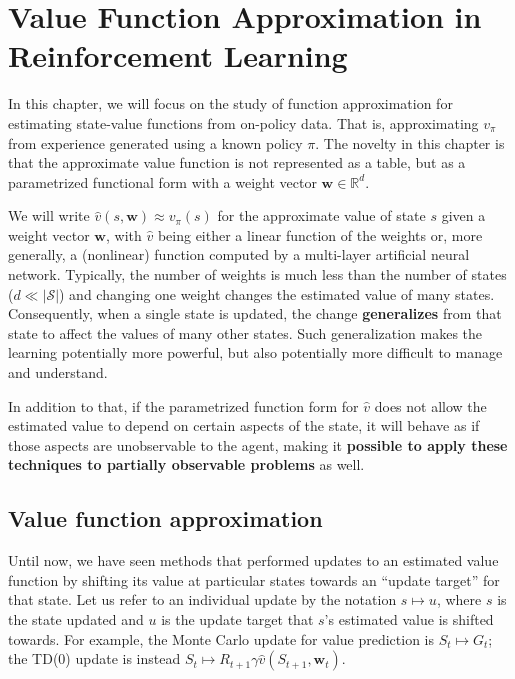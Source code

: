 \chapter{Value Function Approximation in Reinforcement Learning}
In this chapter, we will focus on the study of function approximation for estimating state-value functions from on-policy data. That is, approximating $v_\pi$ from experience generated using a known policy $\pi$. The novelty in this chapter is that the approximate value function is not represented as a table, but as a parametrized functional form with a weight vector $\boldsymbol{w} \in \mathbb{R}^d$.

We will write $\hat{v}(s,\boldsymbol{w}) \approx v_\pi (s)$ for the approximate value of state $s$ given a weight vector $\boldsymbol{w}$, with $\hat{v}$ being either a linear function of the weights or, more generally, a (nonlinear) function computed by a multi-layer artificial neural network. Typically, the number of weights is much less than the number of states ($d \ll \left|\mathcal{S}\right|$) and changing one weight changes the estimated value of many states. Consequently, when a single state is updated, the change \textbf{generalizes} from that state to affect the values of many other states. Such generalization makes the learning potentially more powerful, but also potentially more difficult to manage and understand.

In addition to that, if the parametrized function form for $\hat{v}$  does not allow the estimated value to depend on certain aspects of the state, it will behave as if those aspects are unobservable to the agent, making it \textbf{possible to apply these techniques to partially observable problems} as well.

\section{Value function approximation}
Until now, we have seen methods that performed updates to an estimated value function by shifting its value at particular states towards an ``update target'' for that state. Let us refer to an individual update by the notation $s \mapsto u$, where $s$ is the state updated and $u$ is the update target that $s$’s estimated value is shifted towards. For example, the Monte Carlo update for value prediction is $S_t \mapsto G_t$; the TD(0) update is instead $S_t \mapsto R_{t+1} \gamma \hat{v} \left( S_{t+1},\boldsymbol{w}_t \right)$.


